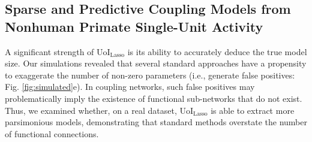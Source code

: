 \documentclass[letterpaper, 10 pt, conference]{ieeeconf}  %
\begin{document}
\subsection{Sparse and Predictive Coupling Models from Nonhuman Primate Single-Unit Activity}
A significant strength of UoI$_{\text{Lasso}}$ is its ability to accurately deduce the true model size. Our simulations revealed that several standard approaches have a propensity to exaggerate the number of non-zero parameters (i.e., generate false positives: Fig. \ref{fig:simulated}e). In coupling networks, such false positives may problematically imply the existence of functional sub-networks that do not exist. Thus, we examined whether, on a real dataset, UoI$_{\text{Lasso}}$ is able to extract more parsimonious models, demonstrating that standard methods overstate the number of functional connections.
\end{document}
